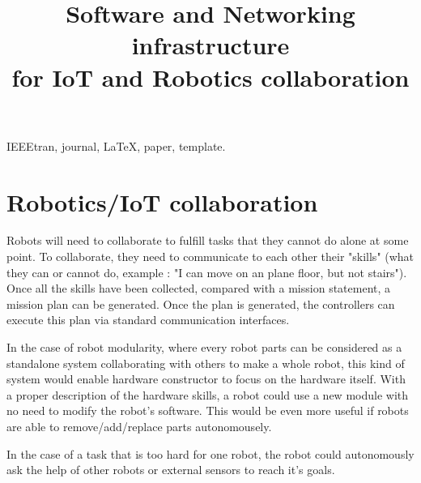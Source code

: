 \documentclass[conference]{IEEEtran}
\begin{document}
\title{Software and Networking infrastructure \\for IoT and Robotics collaboration}

\author{
\and
{}
\and
{}
}

\maketitle

\begin{abstract}
\end{abstract}

\begin{IEEEkeywords}
IEEEtran, journal, \LaTeX, paper, template.
\end{IEEEkeywords}

\IEEEpeerreviewmaketitle

\section{Robotics/IoT collaboration}

Robots will need to collaborate to fulfill tasks that they cannot do alone at some point.
To collaborate, they need to communicate to each other their "skills" (what they can or cannot do, example : "I can move on an plane floor, but not stairs").
Once all the skills have been collected, compared with a mission statement, a mission plan can be generated.
Once the plan is generated, the controllers can execute this plan via standard communication interfaces.

In the case of robot modularity, where every robot parts can be considered as a standalone system collaborating with others to make a whole robot, this kind of system would enable hardware constructor to focus on the hardware itself.
With a proper description of the hardware skills, a robot could use a new module with no need to modify the robot's software.
This would be even more useful if robots are able to remove/add/replace parts autonomousely.

In the case of a task that is too hard for one robot, the robot could autonomously ask the help of other robots or external sensors to reach it's goals.
\end{document}
